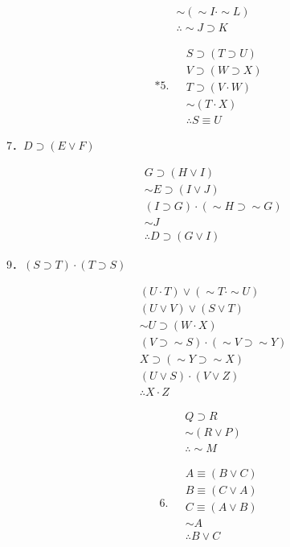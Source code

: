 $$
\begin{aligned}
& \sim(\sim I \cdot \sim L) \\
& \therefore \sim J \supset K
\end{aligned}
$$

$$
\text { *5. } \begin{aligned}
& S \supset(T \supset U) \\
& V \supset(W \supset X) \\
& T \supset(V \cdot W) \\
& \sim(T \cdot X) \\
& \therefore S \equiv U
\end{aligned}
$$

7．$D \supset(E \vee F)$

$$
\begin{aligned}
& G \supset(H \vee I) \\
& \sim E \supset(I \vee J) \\
& (I \supset G) \cdot(\sim H \supset \sim G) \\
& \sim J \\
& \therefore D \supset(G \vee I)
\end{aligned}
$$

9．$(S \supset T) \cdot(T \supset S)$

$$
\begin{aligned}
& (U \cdot T) \vee(\sim T \cdot \sim U) \\
& (U \vee V) \vee(S \vee T) \\
& \sim U \supset(W \cdot X) \\
& (V \supset \sim S) \cdot(\sim V \supset \sim Y) \\
& X \supset(\sim Y \supset \sim X) \\
& (U \vee S) \cdot(V \vee Z) \\
& \therefore X \cdot Z
\end{aligned}
$$

$$
\begin{aligned}
& Q \supset R \\
& \sim(R \vee P) \\
& \therefore \sim M
\end{aligned}
$$

$$
\text { 6. } \begin{aligned}
& A \equiv(B \vee C) \\
& B \equiv(C \vee A) \\
& C \equiv(A \vee B) \\
& \sim A \\
& \therefore B \vee C
\end{aligned}
$$

